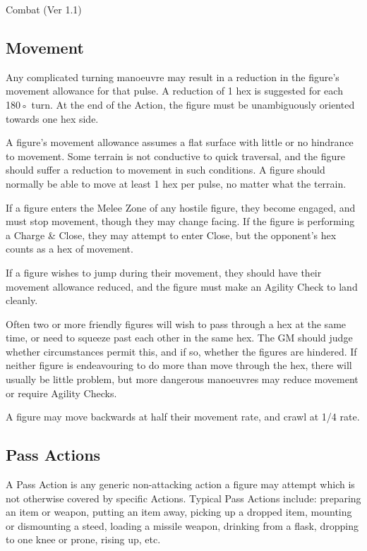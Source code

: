 \begin{Chapter}{Combat (Ver 1.1)}
\subsection{Movement}

Any complicated turning manoeuvre may result in a reduction in the
figure’s movement allowance for that pulse.  A reduction of 1 hex is
suggested for each 180◦ turn. At the end of the Action, the figure
must be unambiguously oriented towards one hex side.

A figure’s movement allowance assumes a flat surface with little or no
hindrance to movement.  Some terrain is not conductive to quick
traversal, and the figure should suffer a reduction to movement in
such conditions.  A figure should normally be able to move at least 1
hex per pulse, no matter what the terrain.

If a figure enters the Melee Zone of any hostile figure, they become
engaged, and must stop movement, though they may change facing.  If
the figure is performing a Charge \& Close, they may attempt to enter
Close, but the opponent’s hex counts as a hex of movement.

If a figure wishes to jump during their movement, they should have
their movement allowance reduced, and the figure must make an Agility
Check to land cleanly.

Often two or more friendly figures will wish to pass through a hex at
the same time, or need to squeeze past each other in the same hex.
The GM should judge whether circumstances permit this, and if so,
whether the figures are hindered.  If neither figure is endeavouring
to do more than move through the hex, there will usually be little
problem, but more dangerous manoeuvres may reduce movement or require
Agility Checks.

A figure may move backwards at half their movement rate, and crawl at
1/4 rate.

\subsection{Pass Actions}

A Pass Action is any generic non-attacking action a figure may attempt
which is not otherwise covered by specific Actions.  Typical Pass
Actions include: preparing an item or weapon, putting an item away,
picking up a dropped item, mounting or dismounting a steed, loading a
missile weapon, drinking from a flask, dropping to one knee or prone,
rising up, etc.


\end{Chapter}
